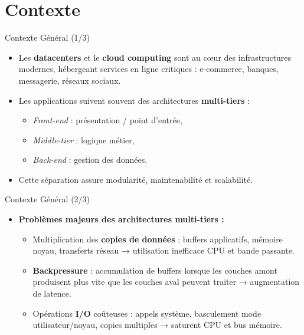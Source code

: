 \documentclass[aspectratio=43,8pt]{beamer}
\begin{document}
\section{Contexte}
\begin{frame}{Contexte Général (1/3)}
    \begin{card}
        \begin{itemize}
            \item Les \textbf{datacenters} et le \textbf{cloud computing} sont au cœur des infrastructures modernes, hébergeant services en ligne critiques : e-commerce, banques, messagerie, réseaux sociaux.
            \item Les applications suivent souvent des architectures \textbf{multi-tiers} : 
            \begin{itemize}
                \item \emph{Front-end} : présentation / point d'entrée,
                \item \emph{Middle-tier} : logique métier,
                \item \emph{Back-end} : gestion des données.
            \end{itemize}
            \item Cette séparation assure modularité, maintenabilité et scalabilité.
        \end{itemize}
    \end{card}
\end{frame}

\begin{frame}{Contexte Général (2/3)}
    \begin{card}
        \begin{itemize}
            \item \textbf{Problèmes majeurs des architectures multi-tiers :}
            \begin{itemize}
                \item Multiplication des \textbf{copies de données} : buffers applicatifs, mémoire noyau, transferts réseau → utilisation inefficace CPU et bande passante.
                \item \textbf{Backpressure} : accumulation de buffers lorsque les couches amont produisent plus vite que les couches aval peuvent traiter → augmentation de latence.
                \item Opérations \textbf{I/O} coûteuses : appels système, basculement mode utilisateur/noyau, copies multiples → saturent CPU et bus mémoire.
            \end{itemize}
        \end{itemize}
    \end{card}
\end{frame}
\end{document}
